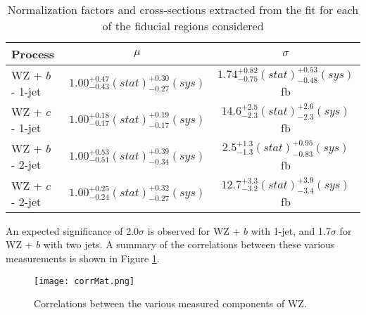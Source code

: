\hspace{-1in}\begin{table}[H]
\begin{adjustwidth}{-3em}{-3em}
\begin{center}
\begin{tabular}{|l|c|c|}
\hline
Process & $\mu$ & $\sigma$ \\
\hline
WZ + $b$ - 1-jet & $1.00^{+0.47}_{-0.43}(stat)^{+0.30}_{-0.27}(sys)$ & $1.74^{+0.82}_{-0.75}(stat)^{+0.53}_{-0.48}(sys)$ fb \\
WZ + $c$ - 1-jet & $1.00^{+0.18}_{-0.17}(stat)^{+0.19}_{-0.17}(sys)$ & $14.6^{+2.5}_{-2.3}(stat)^{+2.6}_{-2.3}(sys)$ fb \\
WZ + $b$ - 2-jet & $1.00^{+0.53}_{-0.51}(stat)^{+0.39}_{-0.34}(sys)$ & $2.5^{+1.3}_{-1.3}(stat)^{+0.95}_{-0.83}(sys)$ fb \\
WZ + $c$ - 2-jet & $1.00^{+0.25}_{-0.24}(stat)^{+0.32}_{-0.27}(sys)$ & $12.7^{+3.3}_{-3.2}(stat)^{+3.9}_{-3.4}(sys)$ fb \\
\hline
\end{tabular}
\caption{Normalization factors and cross-sections extracted from the fit for each of the fiducial regions considered}
\label{tab:WZ_results}
\end{center}
\end{adjustwidth}
\end{table}

An expected significance of 2.0$\sigma$ is observed for WZ + $b$ with 1-jet, and 1.7$\sigma$ for WZ + $b$ with two jets. A summary of the correlations between these various measurements is shown in Figure \ref{fig:corrMat}.

\begin{figure}[H]
  \center
  \texttt{[image: corrMat.png]}
  \caption{Correlations between the various measured components of WZ.}
  \label{fig:corrMat}
\end{figure}




